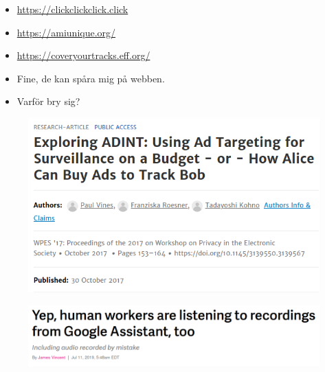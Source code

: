 \begin{frame}
  \begin{example}
    \begin{itemize}
      \item \url{https://clickclickclick.click}
      \item \url{https://amiunique.org/}
      \item \url{https://coveryourtracks.eff.org/}
    \end{itemize}
  \end{example}
\end{frame}

\begin{frame}
  \begin{question}
    \begin{itemize}
      \item Fine, de kan spåra mig på webben.
      \item Varför bry sig?
    \end{itemize}
  \end{question}
\end{frame}

\begin{frame}
  \begin{figure}
    \includegraphics[width=\columnwidth]{fig/adint.png}
  \end{figure}
\end{frame}

\begin{frame}
  \begin{figure}
    \includegraphics[width=\columnwidth]{fig/listening-assistants.png}
  \end{figure}
\end{frame}

